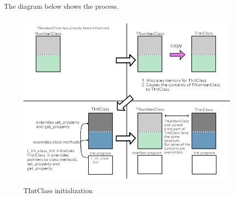 The diagram below shows the process.

\begin{figure}
\centering
\includegraphics[width=12cm,height=9cm]{../image/tintclass_init.png}
\caption{TIntClass initialization}
\end{figure}
